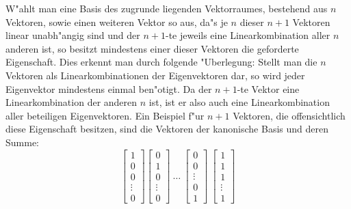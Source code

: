 W"ahlt man eine Basis des zugrunde liegenden Vektorraumes, bestehend aus $n$
Vektoren, sowie einen
weiteren Vektor so aus, da"s je $n$ dieser $n+1$ Vektoren linear unabh"angig
sind und der $n+1$-te jeweils eine Linearkombination aller $n$ anderen ist,
so besitzt mindestens einer dieser Vektoren die geforderte Eigenschaft.
Dies erkennt man durch folgende "Uberlegung:
Stellt man die $n$ Vektoren als Linearkombinationen der Eigenvektoren dar,
so wird jeder Eigenvektor mindestens einmal ben"otigt. Da der $n+1$-te
Vektor eine Linearkombination der anderen $n$ ist, ist er also auch eine
Linearkombination aller beteiligen Eigenvektoren. Ein Beispiel f"ur 
$n+1$ Vektoren, die offensichtlich diese Eigenschaft besitzen, sind die
Vektoren der kanonische Basis und deren Summe:
\[ 
   \left[
       \begin{array}{c}
           1 \\ 0 \\ 0 \\ \vdots \\ 0
       \end{array}
   \right]
   \left[
       \begin{array}{c}
           0 \\ 1 \\ 0 \\ \vdots \\ 0
       \end{array}
   \right] \: \ldots  \:
   \left[
       \begin{array}{c}
           0 \\ 0 \\ \vdots \\ 0 \\ 1
       \end{array}
   \right] \: 
   \left[
       \begin{array}{c}
           1 \\ 1 \\ 1 \\ \vdots \\ 1
       \end{array}
   \right]  
\]

